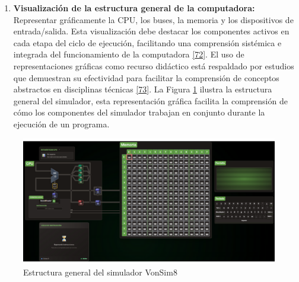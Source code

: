 \documentclass[12pt,oneside]{templates/unerthesis}
\providecommand{\tightlist}{%
  \setlength{\itemsep}{0pt}\setlength{\parskip}{0pt}}
\begin{document}
\begin{enumerate}
\def\labelenumi{\arabic{enumi}.}
\tightlist
\item
  \textbf{Visualización de la estructura general de la computadora:}
  Representar gráficamente la CPU, los buses, la memoria y los dispositivos de entrada/salida. Esta visualización debe destacar los componentes activos en cada etapa del ciclo de ejecución, facilitando una comprensión sistémica e integrada del funcionamiento de la computadora \protect\hyperlink{ref-w3c_accessibility_2021}{{[}72{]}}. El uso de representaciones gráficas como recurso didáctico está respaldado por estudios que demuestran su efectividad para facilitar la comprensión de conceptos abstractos en disciplinas técnicas \protect\hyperlink{ref-sorva2013visualizations}{{[}73{]}}. La Figura \ref{fig:diagramasimulador} ilustra la estructura general del simulador, esta representación gráfica facilita la comprensión de cómo los componentes del simulador trabajan en conjunto durante la ejecución de un programa.
\end{enumerate}

\begin{figure}

\hfill{}\includegraphics[width=0.93\linewidth]{images/estructurasimulador} 

\caption{Estructura general del simulador VonSim8}\label{fig:diagramasimulador}
\end{figure}
\end{document}
